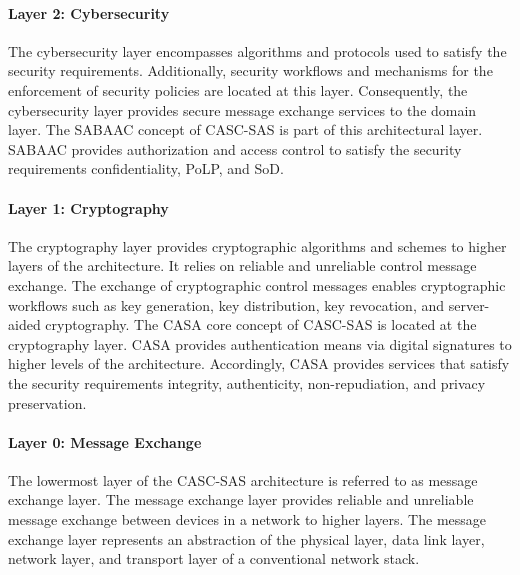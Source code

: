 \paragraph{Layer 2: Cybersecurity}
The cybersecurity layer encompasses algorithms and protocols used to satisfy the security requirements.
Additionally, security workflows and mechanisms for the enforcement of security policies are located at this layer.
Consequently, the cybersecurity layer provides secure message exchange services to the domain layer.
The SABAAC concept of CASC-SAS is part of this architectural layer.
SABAAC provides authorization and access control to satisfy the security requirements confidentiality, PoLP, and SoD.

\paragraph{Layer 1: Cryptography}
The cryptography layer provides cryptographic algorithms and schemes to higher layers of the architecture.
It relies on reliable and unreliable control message exchange.
The exchange of cryptographic control messages enables cryptographic workflows such as key generation, key distribution, key revocation, and server-aided cryptography.
The CASA core concept of CASC-SAS is located at the cryptography layer.
CASA provides authentication means via digital signatures to higher levels of the architecture.
Accordingly, CASA provides services that satisfy the security requirements integrity, authenticity, non-repudiation, and privacy preservation.

\paragraph{Layer 0: Message Exchange}
The lowermost layer of the CASC-SAS architecture is referred to as message exchange layer.
The message exchange layer provides reliable and unreliable message exchange between devices in a network to higher layers.
The message exchange layer represents an abstraction of the physical layer, data link layer, network layer, and transport layer of a conventional network stack.

